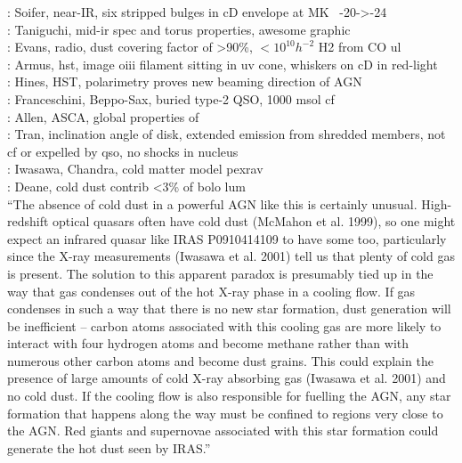 \documentclass{emulateapj}
\begin{document}
\citet{1996AJ....111..649S}: Soifer, near-IR, six stripped bulges in
cD envelope at MK~ -20->-24\\

\citet{1997A&A...318L...1T}: Taniguchi, mid-ir spec and torus
properties, awesome graphic\\

\citet{1998ApJ...506..205E}: Evans, radio, dust covering factor of
>90\%, $<10^{10} h^{-2}$ \Msol H2 from CO ul\\

\citet{1999Ap&SS.266..113A}: Armus, hst, image oiii filament sitting
in uv cone, whiskers on cD in red-light\\

\citet{1999ApJ...512..145H}: Hines, HST, polarimetry proves new
beaming direction of AGN\\

\citet{2000A&A...353..910F}: Franceschini, Beppo-Sax, buried type-2
QSO, 1000 msol cf\\

\citet{2000MNRAS.315..269A}: Allen, ASCA, global properties of \iras\\

\citet{2000AJ....120..562T}: Tran, inclination angle of disk, extended
emission from shredded members, not cf or expelled by qso, no shocks
in nucleus\\

\citet{2001MNRAS.321L..15I}: Iwasawa, Chandra, cold matter model
pexrav\\

\citet{2001MNRAS.326.1467D}: Deane, cold dust contrib <3\% of bolo
lum\\

``The absence of cold dust in a powerful AGN like this is certainly
unusual. High-redshift optical quasars often have cold dust (McMahon
et al. 1999), so one might expect an infrared quasar like IRAS
P0910414109 to have some too, particularly since the X-ray
measurements (Iwasawa et al. 2001) tell us that plenty of cold gas is
present. The solution to this apparent paradox is presumably tied up
in the way that gas condenses out of the hot X-ray phase in a cooling
flow. If gas condenses in such a way that there is no new star
formation, dust generation will be inefficient -- carbon atoms
associated with this cooling gas are more likely to interact with four
hydrogen atoms and become methane rather than with numerous other
carbon atoms and become dust grains. This could explain the presence
of large amounts of cold X-ray absorbing gas (Iwasawa et al. 2001) and
no cold dust. If the cooling flow is also responsible for fuelling the
AGN, any star formation that happens along the way must be confined to
regions very close to the AGN. Red giants and supernovae associated
with this star formation could generate the hot dust seen by IRAS.''
\end{document}
